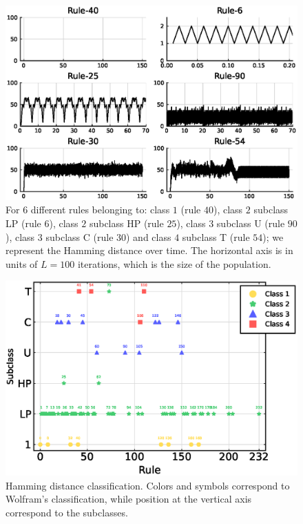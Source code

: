 \begin{figure}
    \centering
    \includegraphics[width=\textwidth]{Images/P4/HammingTimeSeries.eps}
    \caption{For 6 different rules belonging to: class $1$ (rule $40$), class $2$ subclass LP (rule $6$), class $2$ subclass HP (rule $25$), class $3$ subclass U (rule $90$), class $3$ subclass C (rule $30$) and class $4$ subclass T (rule $54$); we represent the Hamming distance over time. The horizontal axis is in units of $L=100$ iterations, which is the size of the population.}
    \label{fig:HammDistTimeSeries}
\end{figure}


\begin{figure}
    \centering
    \includegraphics[width=\linewidth]{Images/P4/HammingClass.eps}
    \caption{Hamming distance classification. Colors and symbols correspond to Wolfram's classification, while position at the vertical axis correspond to the subclasses.}
    \label{fig:HammDistClass}
\end{figure}



